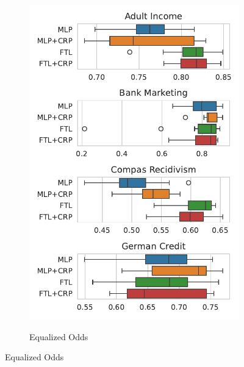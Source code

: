 \begin{figure}[!ht]
\begin{subfigure}{.32\linewidth}
    \includegraphics[width=1\linewidth]{images/boxplot_acc_opportunity_crp.pdf}
\end{subfigure}
\begin{subfigure}{.32\linewidth}
    \caption{Equalized Odds}
    \label{fig:boxplot_acc_odds}

\end{subfigure}
\end{figure}
